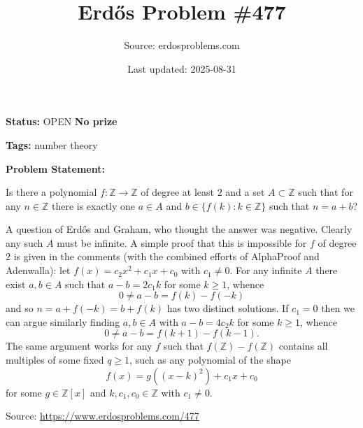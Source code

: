 \documentclass{article}
\title{Erd\H{o}s Problem \#477}
\date{Last updated: 2025-08-31}
\author{Source: erdosproblems.com}
\begin{document}
\maketitle

\noindent\textbf{Status:} OPEN \quad \textbf{No prize}

\noindent\textbf{Tags:} number theory

\medskip

\noindent\textbf{Problem Statement:}

Is there a polynomial $f:\mathbb{Z}\to \mathbb{Z}$ of degree at least $2$ and a set $A\subset \mathbb{Z}$ such that for any $n\in \mathbb{Z}$ there is exactly one $a\in A$ and $b\in \{ f(k) : k\in\mathbb{Z}\}$ such that $n=a+b$?




A question of Erd\H{o}s and Graham, who thought the answer was negative. Clearly any such $A$ must be infinite. A simple proof that this is impossible for $f$ of degree $2$ is given in the comments (with the combined efforts of AlphaProof and Adenwalla): let $f(x)=c_2x^2+c_1x+c_0$ with $c_1\neq 0$. For any infinite $A$ there exist $a,b\in A$ such that $a-b=2c_1k$ for some $k\geq 1$, whence\[0\neq a-b=f(k)-f(-k)\]and so $n=a+f(-k)=b+f(k)$ has two distinct solutions. If $c_1=0$ then we can argue similarly finding $a,b\in A$ with $a-b=4c_2k$ for some $k\geq 1$, whence\[0\neq a-b=f(k+1)-f(k-1).\]The same argument works for any $f$ such that $f(\mathbb{Z})-f(\mathbb{Z})$ contains all multiples of some fixed $q\geq 1$, such as any polynomial of the shape\[f(x)=g((x-k)^2)+c_1x+c_0\]for some $g\in \mathbb{Z}[x]$ and $k,c_1,c_0\in \mathbb{Z}$ with $c_1\neq 0$.


\bigskip
\noindent\small{Source: \url{https://www.erdosproblems.com/477}}
\end{document}
